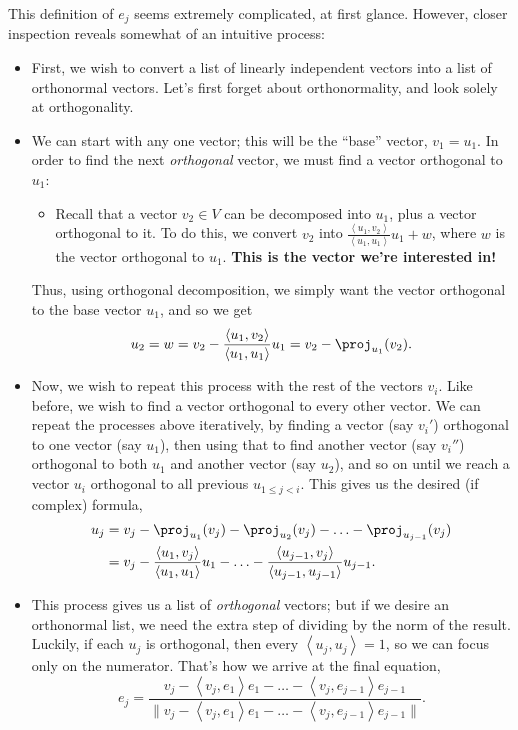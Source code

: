 \documentclass[math0540-lecture-notes.tex]{subfiles}
\begin{document}
This definition of $e_j$ seems extremely complicated, at first glance. However, closer inspection
reveals somewhat of an intuitive process:
\begin{itemize}
  \item First, we wish to convert a list of linearly independent vectors into a list of orthonormal
    vectors. Let's first forget about orthonormality, and look solely at orthogonality.
  \item We can start with any one vector; this will be the ``base'' vector, $v_1=u_1$. In order to find
    the next \textit{orthogonal} vector, we must find a vector orthogonal to $u_1$:
    \begin{itemize}
      \item Recall that a vector $v_2\in V$ can be decomposed into $u_1$, plus a vector orthogonal
        to it. To do this, we convert $v_2$ into $\frac{\left<u_1,v_2 \right>}{\left<u_1,u_1
        \right>}u_1+w$, where $w$ is the vector orthogonal to $u_1$. \textbf{This is the vector
      we're interested in!}
    \end{itemize}
    Thus, using orthogonal decomposition, we simply want the vector orthogonal to the base vector
    $u_1$, and so we get \[
      u_2=w=v_2-\frac{\left<u_1,v_2 \right>}{\left<u_1,u_1 \right>}u_1=v_2-\proj_{u_1}(v_2)
    .\] 
  \item Now, we wish to repeat this process with the rest of the vectors $v_i$. Like before, we wish
    to find a vector orthogonal to every other vector. We can repeat the processes above
    iteratively, by finding a vector (say $v_i'$) orthogonal to one vector (say $u_1$), then using
    that to find another vector (say $v_i''$) orthogonal to both $u_1$ and another vector (say
    $u_2$), and so on until we reach a vector $u_i$ orthogonal to all previous $u_{1\le j<i}$. This
    gives us the desired (if complex) formula,
    \begin{align*}
      u_j&=v_j-\proj_{u_1}(v_j)-\proj_{u_2}(v_j)-\ldots-\proj_{u_{j-1}}(v_j)\\
         &=v_j-\frac{\left<u_1,v_j \right>}{\left<u_1,u_1 \right>}u_1-\ldots-\frac{\left<u_{j-1},v_j
         \right>}{\left<u_{j-1},u_{j-1} \right>}u_{j-1}
    .\end{align*}
  \item This process gives us a list of \textit{orthogonal} vectors; but if we desire an orthonormal
    list, we need the extra step of dividing by the norm of the result. Luckily, if each $u_j$ is
    orthogonal, then every $\left<u_j,u_j \right>=1$, so we can focus only on the numerator. That's
    how we arrive at the final equation, \[
      e_j=\frac{v_j-\left<v_j,e_1 \right>e_1-\ldots-\left<v_j,e_{j-1}
      \right>e_{j-1}}{\|v_j-\left<v_j,e_1 \right>e_1-\ldots-\left<v_j,e_{j-1} \right>e_{j-1}\|}
    .\] 
\end{itemize}
\end{document}
